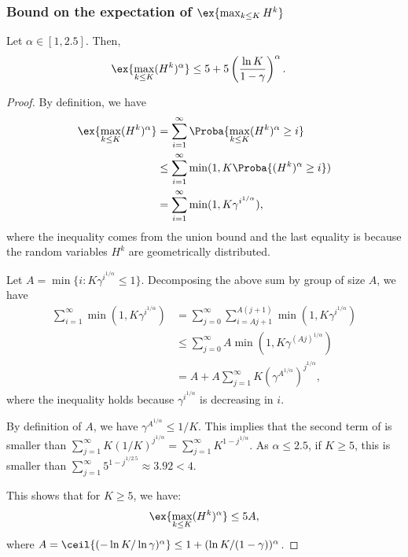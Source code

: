 \begin{subappendices}
\subsubsection{Bound on the expectation of $\ex{\max_{k\le K}H^k}$}

\begin{lem}
    \label{lem:moment}
    Let $\alpha\in[1,2.5]$. Then,
    \begin{align}
        \label{eq:lemma_HK}
        \ex{\max_{k\le K}(H^k)^\alpha} &\le 5+5\left(\frac{\ln K}{1-\gamma}\right)^\alpha.
    \end{align}
 \end{lem}
 \begin{proof}
    By definition, we have
    \begin{align*}
        \ex{\max_{k\le K}(H^k)^\alpha} &=  \sum_{i=1}^\infty \Proba{ \max_{k\le K}(H^k)^\alpha \ge i}\\
        &\le \sum_{i=1}^\infty \min(1, K \Proba{ (H^k)^\alpha \ge i})\\
        &= \sum_{i=1}^\infty \min(1, K \gamma^{i^{1/\alpha}}),
    \end{align*}
    where the inequality comes from the union bound and the last equality is because the random variables $H^k$ are geometrically distributed.
 
    Let $A=\min\{i : K \gamma^{i^{1/\alpha}}\le 1\}$. Decomposing the above sum by group of size $A$, we have
    \begin{align}
        \sum_{i=1}^\infty \min(1, K \gamma^{i^{1/\alpha}})
        &= \sum_{j=0}^\infty \sum_{i=Aj+1}^{A(j+1)}\min(1, K \gamma^{i^{1/\alpha}})\nonumber\\
        &\le \sum_{j=0}^\infty A \min(1, K \gamma^{(Aj)^{1/\alpha}})\nonumber\\
        &= A + A\sum_{j=1}^\infty K (\gamma^{A^{1/\alpha}})^{j^{1/\alpha}},
        \label{eq:sum_A}
    \end{align}
    where the inequality holds because $\gamma^{i^{1/\alpha}}$ is decreasing in $i$. 
 
    By definition of $A$, we have $\gamma^{A^{1/\alpha}}\le 1/K$. This implies that the second term of  is smaller than $\sum_{j=1}^\infty K (1/K)^{j^{1/\alpha}}=\sum_{j=1}^\infty K^{1-j^{1/\alpha}}$. As $\alpha\le 2.5$, if  $K\ge5$, this is smaller than $\sum_{j=1}^\infty 5^{1-j^{1/2.5}}\approx 3.92<4$.
 
    This shows that for $K\ge5$, we have:
    \begin{align*}
        \ex{\max_{k\le K}(H^k)^\alpha} \le 5A,
    \end{align*}
    where $A=\ceil{(-\ln K/\ln \gamma)^{\alpha}}\le 1+(\ln K/(1-\gamma ))^\alpha$.
 

\end{proof}
\end{subappendices}
